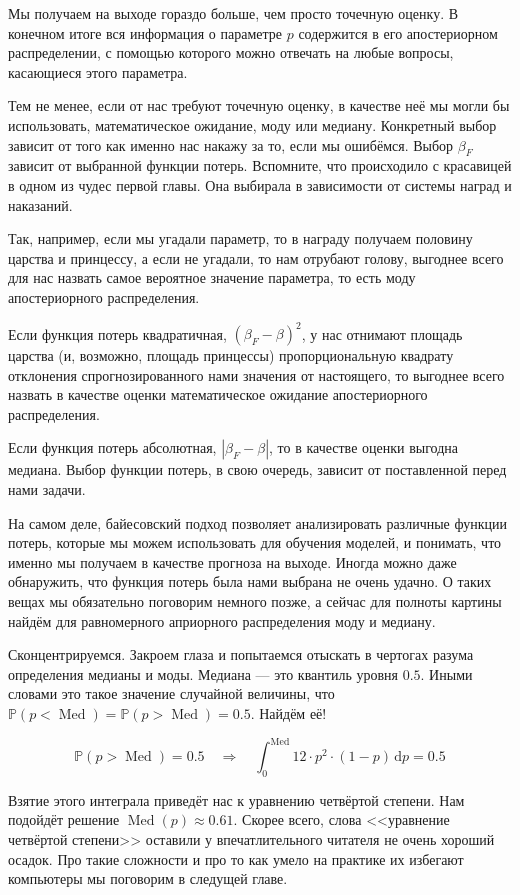 \documentclass[12pt, a4paper, oneside]{extreport}
\DeclareMathOperator{\Med}{Med}
\def \mbb{\mathbb}
\def \PP{\mbb{P}}
\newcommand{\dx}[1]{\,\mathrm{d}#1} %
\theoremstyle{plain}              %
\theoremstyle{definition}         %
\begin{document}
Мы получаем на выходе гораздо больше, чем просто точечную оценку. В конечном итоге вся информация о параметре $p$ содержится в его апостериорном распределении, с помощью которого можно отвечать на любые вопросы, касающиеся этого параметра. 

Тем не менее, если от нас требуют точечную оценку, в качестве неё мы могли бы использовать, математическое ожидание, моду или медиану. Конкретный выбор зависит от того как именно нас накажу за то, если мы ошибёмся. Выбор $\beta_F$ зависит от выбранной функции потерь. Вспомните, что происходило с красавицей в одном из чудес первой главы. Она выбирала в зависимости от системы наград и наказаний. 

Так, например, если мы угадали параметр, то в награду получаем половину царства и принцессу, а если не угадали, то нам отрубают голову, выгоднее всего для нас назвать самое вероятное значение параметра, то есть моду апостериорного распределения. 

Если функция потерь квадратичная, $(\beta_F - \beta)^2$, у нас отнимают площадь царства (и, возможно, площадь принцессы) пропорциональную квадрату отклонения спрогнозированного нами значения от настоящего, то выгоднее всего назвать в качестве оценки математическое ожидание апостериорного распределения.

Если функция потерь абсолютная, $|\beta_F - \beta|$, то в качестве оценки выгодна медиана. Выбор функции потерь, в свою очередь, зависит от поставленной перед нами задачи.

На самом деле, байесовский подход позволяет анализировать различные функции потерь, которые мы можем использовать для обучения моделей, и понимать, что именно мы получаем в качестве прогноза на выходе. Иногда можно даже обнаружить, что функция потерь была нами выбрана не очень удачно. О таких вещах мы обязательно поговорим немного позже, а сейчас для полноты картины найдём для равномерного априорного распределения моду и медиану.

Сконцентрируемся. Закроем глаза и попытаемся отыскать в чертогах разума определения медианы и моды.  Медиана --- это квантиль уровня $0.5$. Иными словами это такое значение случайной величины, что $\PP(p < \Med) = \PP(p > \Med) = 0.5$. Найдём её!

\[ \PP(p > \Med) = 0.5 \quad \Rightarrow \quad \int_0^{\Med} 12 \cdot p^2 \cdot (1-p) \dx{p} = 0.5  \]

Взятие этого интеграла приведёт нас к уравнению четвёртой степени. Нам подойдёт решение $\Med(p) \approx 0.61 $. Скорее всего, слова <<уравнение четвёртой степени>> оставили у впечатлительного  читателя не очень хороший осадок. Про такие сложности и про то как умело на практике их избегают компьютеры мы поговорим в следущей главе. 
\end{document}

